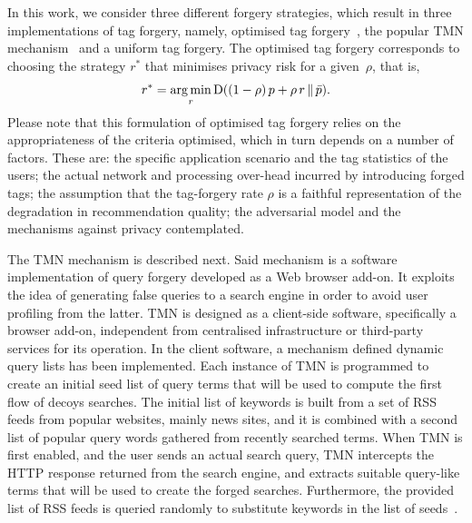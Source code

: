 In this work, we consider three different forgery strategies, which result in three implementations of tag forgery, namely, optimised tag forgery~\cite{Rebollo10IT}, the popular TMN mechanism~\cite{Howe06B} and a uniform tag forgery.
The optimised tag forgery corresponds to choosing the strategy $r^*$ that minimises privacy risk for a given~$\rho$, that is,
$$r^* = \operatorname*{arg\,min}_r \operatorname{D}((1 - \rho)\,p + \rho\,r\,\|\,\bar{p}).$$
Please note that this formulation of optimised tag forgery relies on the appropriateness of the criteria optimised, which in turn depends on a number of factors. These are: the specific application scenario and the tag statistics of the users; the actual network and processing over-head incurred by introducing forged tags; the assumption that the tag-forgery rate $\rho$ is a faithful representation of the degradation in recommendation quality; the adversarial model and the mechanisms against privacy contemplated.

The TMN mechanism is described next. Said mechanism is a software implementation of query forgery developed as a Web browser add-on. It exploits the idea of generating false queries to a search engine in order to avoid user profiling from the latter. TMN is designed as a client-side software, specifically a browser add-on, independent from centralised infrastructure or third-party services for its operation. In the client software, a mechanism defined dynamic query lists has been implemented. Each instance of TMN is programmed to create an initial seed list of query terms that will be used to compute the first flow of decoys searches. The initial list of keywords is built from a set of RSS feeds from popular websites, mainly news sites, and it is combined with a second list of popular query words gathered from recently searched terms. When TMN is first enabled, and the user sends an actual search query, TMN intercepts the HTTP response returned from the search engine, and extracts suitable query-like terms that will be used to create the forged searches. Furthermore, the provided list of RSS feeds is queried randomly to substitute keywords in the list of seeds~\cite{a24}.

